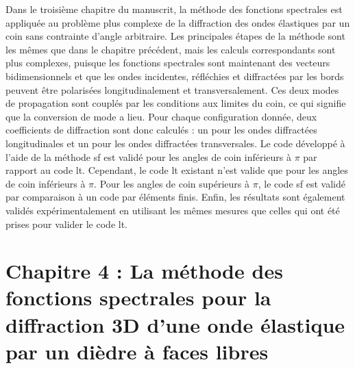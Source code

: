 Dans le troisième chapitre du manuscrit, la méthode des fonctions spectrales est appliquée au problème plus complexe de la diffraction des ondes élastiques par un coin sans contrainte d'angle arbitraire. Les principales étapes de la méthode sont les mêmes que dans le chapitre précédent, mais les calculs correspondants sont plus complexes, puisque les fonctions spectrales sont maintenant des vecteurs bidimensionnels et que les ondes incidentes, réfléchies et diffractées par les bords peuvent être polarisées longitudinalement et transversalement. Ces deux modes de propagation sont couplés par les conditions aux limites du coin, ce qui signifie que la conversion de mode a lieu. Pour chaque configuration donnée, deux coefficients de diffraction sont donc calculés : un pour les ondes diffractées longitudinales et un pour les ondes diffractées transversales. Le code développé à l'aide de la méthode \acrfull{sf} est validé pour les angles de coin inférieurs à $\pi$ par rapport au code \acrfull{lt}. Cependant, le code \acrshort{lt} existant n'est valide que pour les angles de coin inférieurs à $\pi$. Pour les angles de coin supérieurs à $\pi$, le code \acrshort{sf} est validé par comparaison à un code par éléments finis. Enfin, les résultats sont également validés expérimentalement en utilisant les mêmes mesures que celles qui ont été prises pour valider le code \acrshort{lt}.

\section[Chapitre 4]{Chapitre 4 : La méthode des fonctions spectrales pour la diffraction 3D d'une onde élastique par un dièdre à faces libres}


